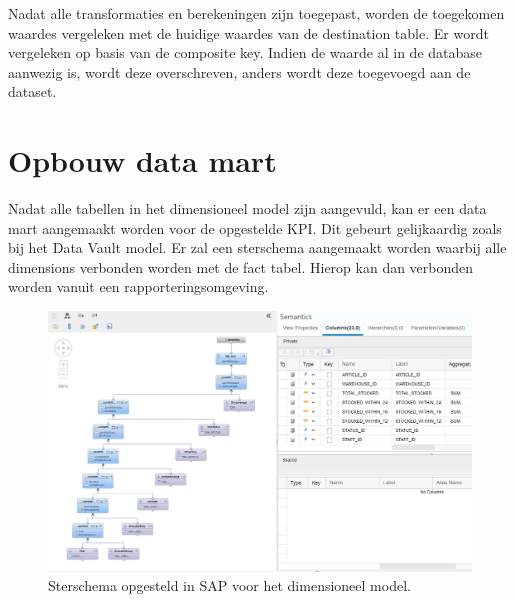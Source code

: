 Nadat alle transformaties en berekeningen zijn toegepast, worden de toegekomen waardes vergeleken met de huidige waardes van de destination table. Er wordt vergeleken op basis van de composite key. Indien de waarde al in de database aanwezig is, wordt deze overschreven, anders wordt deze toegevoegd aan de dataset.

\section{Opbouw data mart}
Nadat alle tabellen in het dimensioneel model zijn aangevuld, kan er een data mart aangemaakt worden voor de opgestelde KPI. Dit gebeurt gelijkaardig zoals bij het Data Vault model. Er zal een sterschema aangemaakt worden waarbij alle dimensions verbonden worden met de fact tabel. Hierop kan dan verbonden worden vanuit een rapporteringsomgeving. 

\begin{figure}[h]
	\centering
	\includegraphics[scale=0.5]{../images/DM_FG_datamart.png}
	\caption{Sterschema opgesteld in SAP voor het dimensioneel model.}
	\label{fig:dmdmart}
\end{figure}
